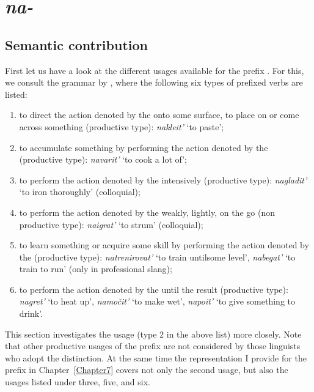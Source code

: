 \section{\textit{na-}}\label{subsection:semantics:na}
\subsection{Semantic contribution}
First let us have a look at the different usages available for the prefix . For this, we consult the grammar by \citet[360]{Shvedova:82}, where the following six types of prefixed verbs are listed:
\begin{enumerate}
\item to direct the action denoted by the  onto some surface, to place on or come across something (productive type): \textit{nakleit'} `to paste';
\item to accumulate something by performing the action denoted by the  (productive type): \textit{navarit'} `to cook a lot of';
\item to perform the action denoted by the  intensively (productive type): \textit{nagladit'} `to iron thoroughly' (colloquial);
\item to perform the action denoted by the  weakly, lightly, on the go (non productive type): \textit{naigrat'} `to strum' (colloquial);
\item to learn something or acquire some skill by performing the action denoted by the  (productive type): \textit{natrenirovat'} `to train until\linebreak some level', \textit{nabegat'} `to train to run' (only in professional slang);
\item to perform the action denoted by the  until the result (productive type): \textit{nagret'} `to heat up', \textit{namo\v{c}it'} `to make wet', \textit{napoit'} `to give something to drink'.
\end{enumerate}

This section investigates the  usage (type 2 in the above list) more closely. Note that other productive usages of the prefix  are not considered  by those linguists who adopt the distinction. At the same time the representation I provide for the prefix  in Chapter~\ref{Chapter7} covers not only the second usage, but also the usages listed under three, five, and six.

